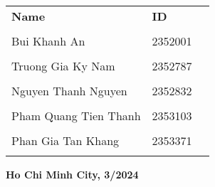 \documentclass[a4paper]{article}
\begin{document}
\begin{titlepage}
\begin{center}
\begin{tabular}{ccc}
    \multicolumn{1}{l}{\Large \textbf{Name}} & 
    \multicolumn{1}{l}{\Large \textbf{ID}} \\ \\

    \multicolumn{1}{l}{\Large Bui Khanh An} &
    \multicolumn{1}{l}{\Large 2352001}\\ \\
    
    \multicolumn{1}{l}{\Large Truong Gia Ky Nam} &
    \multicolumn{1}{l}{\Large 2352787} \\ \\

    \multicolumn{1}{l}{\Large Nguyen Thanh Nguyen} &
    \multicolumn{1}{l}{\Large 2352832} \\ \\
    
    \multicolumn{1}{l}{\Large Pham Quang Tien Thanh} &
    \multicolumn{1}{l}{\Large 2353103} \\ \\

    \multicolumn{1}{l}{\Large Phan Gia Tan Khang} &
    \multicolumn{1}{l}{\Large 2353371} \\ \\
\end{tabular}
\end{center}

\vspace{1cm}

\begin{center}
{\textbf{\Large Ho Chi Minh City, 3/2024}}
\end{center}
\end{titlepage}
\end{document}
